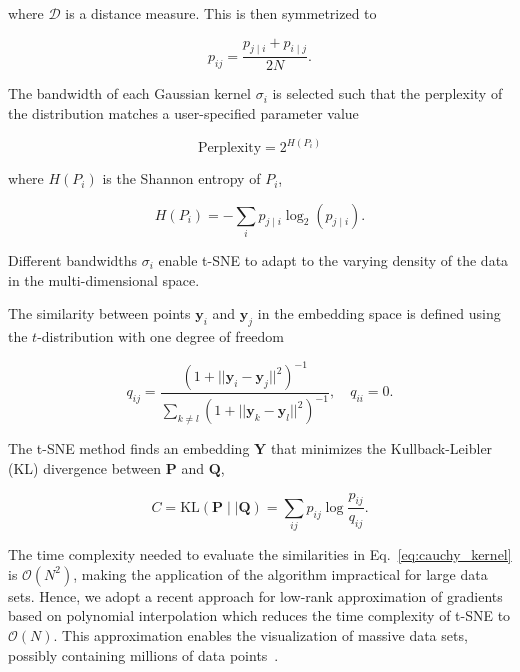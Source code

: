 \documentclass[runningheads]{llncs}
\begin{document}
\noindent where $\mathcal{D}$ is a distance measure. This is then symmetrized to

\begin{equation}
p_{ij} = \frac{p_{j \mid i} + p_{i \mid j}}{2N}.
\label{eq:symmetrize}
\end{equation}

The bandwidth of each Gaussian kernel $\sigma_i$ is selected such that the
perplexity of the distribution matches a user-specified parameter value

\begin{equation}
\text{Perplexity} = 2^{H(P_i)}
\end{equation}

\noindent where $H(P_i)$ is the Shannon entropy of $P_i$,

\begin{equation}
H(P_i) = -\sum_i p_{j \mid i} \log_2 (p_{j \mid i}).
\end{equation}

\noindent Different bandwidths $\sigma_i$ enable t-SNE to adapt to the varying
density of the data in the multi-dimensional space.

The similarity between points $\mathbf{y}_i$ and $\mathbf{y}_j$ in the
embedding space is defined using the $t$-distribution with one degree of
freedom

\begin{equation}
q_{ij} = \frac{\left ( 1 + || \mathbf{y}_i - \mathbf{y}_j ||^2 \right )^{-1}}
{\sum_{k \neq l}\left ( 1 + || \mathbf{y}_k - \mathbf{y}_l ||^2 \right )^{-1}},
\quad q_{ii} = 0.
\label{eq:cauchy_kernel}
\end{equation}

The t-SNE method finds an embedding $\mathbf{Y}$ that minimizes the
Kullback-Leibler (KL) divergence between $\mathbf{P}$ and $\mathbf{Q}$,

\begin{equation}
C = \text{KL}(\mathbf{P} \mid \mid \mathbf{Q}) = \sum_{ij} p_{ij} \log \frac{p_{ij}}{q_{ij}}.
\label{eq:kl_divergence}
\end{equation}

The time complexity needed to evaluate the similarities in
Eq.~\ref{eq:cauchy_kernel} is $\mathcal{O}(N^2)$, making the application of the
algorithm impractical for large data sets.  Hence, we adopt a recent approach
for low-rank approximation of gradients based on polynomial interpolation which
reduces the time complexity of t-SNE to $\mathcal{O}(N)$. This approximation
enables the visualization of massive data sets, possibly containing millions of
data points~\cite{fi_tsne}.
\end{document}
